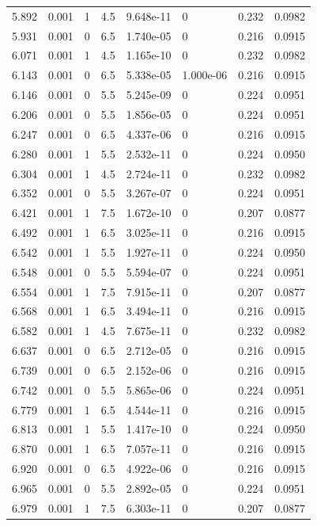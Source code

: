 \documentclass[preview]{standalone}
\begin{document}
{{{{\begin{tabular}{L{1.2cm}C{1.2cm} C{0.3cm}C{0.5cm} C{1.4cm}C{1.4cm} C{1.4cm}C{1.4cm}}
  5.892  &  0.001  & 1     & 4.5 &  9.648e-11  & 0  & 0.232 &  0.0982   \\ 
  5.931  &  0.001  & 0     & 6.5 &  1.740e-05  & 0  & 0.216 &  0.0915   \\ 
  6.071  &  0.001  & 1     & 4.5 &  1.165e-10  & 0  & 0.232 &  0.0982   \\ 
  6.143  &  0.001  & 0     & 6.5 &  5.338e-05  & 1.000e-06  & 0.216 &  0.0915   \\ 
  6.146  &  0.001  & 0     & 5.5 &  5.245e-09  & 0  & 0.224 &  0.0951   \\ 
  6.206  &  0.001  & 0     & 5.5 &  1.856e-05  & 0  & 0.224 &  0.0951   \\ 
  6.247  &  0.001  & 0     & 6.5 &  4.337e-06  & 0  & 0.216 &  0.0915   \\ 
  6.280  &  0.001  & 1     & 5.5 &  2.532e-11  & 0  & 0.224 &  0.0950   \\ 
  6.304  &  0.001  & 1     & 4.5 &  2.724e-11  & 0  & 0.232 &  0.0982   \\ 
  6.352  &  0.001  & 0     & 5.5 &  3.267e-07  & 0  & 0.224 &  0.0951   \\ 
  6.421  &  0.001  & 1     & 7.5 &  1.672e-10  & 0  & 0.207 &  0.0877   \\ 
  6.492  &  0.001  & 1     & 6.5 &  3.025e-11  & 0  & 0.216 &  0.0915   \\ 
  6.542  &  0.001  & 1     & 5.5 &  1.927e-11  & 0  & 0.224 &  0.0950   \\ 
  6.548  &  0.001  & 0     & 5.5 &  5.594e-07  & 0  & 0.224 &  0.0951   \\ 
  6.554  &  0.001  & 1     & 7.5 &  7.915e-11  & 0  & 0.207 &  0.0877   \\ 
  6.568  &  0.001  & 1     & 6.5 &  3.494e-11  & 0  & 0.216 &  0.0915   \\ 
  6.582  &  0.001  & 1     & 4.5 &  7.675e-11  & 0  & 0.232 &  0.0982   \\ 
  6.637  &  0.001  & 0     & 6.5 &  2.712e-05  & 0  & 0.216 &  0.0915   \\ 
  6.739  &  0.001  & 0     & 6.5 &  2.152e-06  & 0  & 0.216 &  0.0915   \\ 
  6.742  &  0.001  & 0     & 5.5 &  5.865e-06  & 0  & 0.224 &  0.0951   \\ 
  6.779  &  0.001  & 1     & 6.5 &  4.544e-11  & 0  & 0.216 &  0.0915   \\ 
  6.813  &  0.001  & 1     & 5.5 &  1.417e-10  & 0  & 0.224 &  0.0950   \\ 
  6.870  &  0.001  & 1     & 6.5 &  7.057e-11  & 0  & 0.216 &  0.0915   \\ 
  6.920  &  0.001  & 0     & 6.5 &  4.922e-06  & 0  & 0.216 &  0.0915   \\ 
  6.965  &  0.001  & 0     & 5.5 &  2.892e-05  & 0  & 0.224 &  0.0951   \\ 
  6.979  &  0.001  & 1     & 7.5 &  6.303e-11  & 0  & 0.207 &  0.0877   \\ 
\hline 
\end{tabular} 

}}}}
\end{document}
